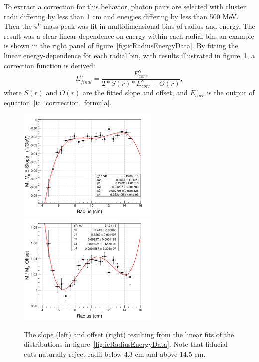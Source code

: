 To extract a correction for this behavior, photon pairs are selected with cluster radii differing by less than 1 cm and energies differing by less than 500 MeV.  Then the $\pi^0$ mass peak was fit in multidimensional bins of radius and energy.  The result was a clear linear dependence on energy within each radial bin; an example is shown in the right panel of figure~\ref{fig:icRadiusEnergyData}.  By fitting the linear energy-dependence for each radial bin, with results illustrated in figure~\ref{fig:icRadiusEnergySlopeOffset}, a correction function is derived:
\begin{equation}
E^{\gamma}_{final} = \frac{E^{\gamma}_{corr}}{2*S(r)*E^{\gamma}_{corr} + O(r)},
\end{equation}
where $S(r)$ and $O(r)$ are the fitted slope and offset, and $E_{corr}^\gamma$ is the output of equation~\ref{ic_corrrection_formula}.

\begin{figure}[tbp]\centering
\includegraphics[height=5.4cm]{fig_simulation/m_m0_pi0_slope.png}
\includegraphics[height=5.4cm]{fig_simulation/m_m0_pi0_offset.png}
\caption{The slope (left) and offset (right) resulting from the linear fits of the distributions in figure~\ref{fig:icRadiusEnergyData}.  Note that fiducial cuts naturally reject radii below 4.3 cm and above 14.5 cm.}%
\label{fig:icRadiusEnergySlopeOffset}
\end{figure}

